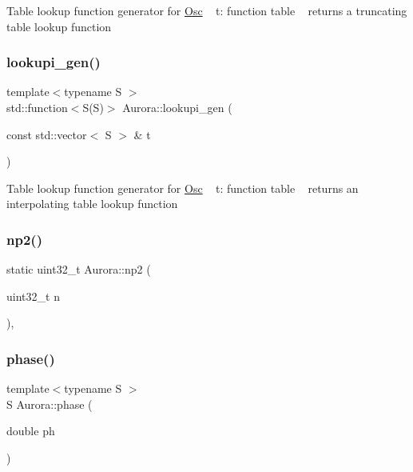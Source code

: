 Table lookup function generator for \hyperlink{class_aurora_1_1_osc}{Osc} ~\newline
t\+: function table ~\newline
returns a truncating table lookup function \mbox{\label{namespace_aurora_a043c55515e053a8d6f31ed7077a1bea6}} 
\subsubsection{\texorpdfstring{lookupi\+\_\+gen()}{lookupi\_gen()}}
{\footnotesize\ttfamily template$<$typename S $>$ \\
std\+::function$<$S(S)$>$ Aurora\+::lookupi\+\_\+gen (\begin{DoxyParamCaption}\item[{const std\+::vector$<$ S $>$ \&}]{t }\end{DoxyParamCaption})}

Table lookup function generator for \hyperlink{class_aurora_1_1_osc}{Osc} ~\newline
t\+: function table ~\newline
returns an interpolating table lookup function \mbox{\label{namespace_aurora_a49b6f6d92479d80271ced42627154066}} 
\subsubsection{\texorpdfstring{np2()}{np2()}}
{\footnotesize\ttfamily static uint32\+\_\+t Aurora\+::np2 (\begin{DoxyParamCaption}\item[{uint32\+\_\+t}]{n }\end{DoxyParamCaption})\hspace{0.3cm}{\ttfamily [inline]}, {\ttfamily [static]}}

\mbox{\label{namespace_aurora_a2fab91108d29c7101741bcd2ebe1ba72}} 
\subsubsection{\texorpdfstring{phase()}{phase()}}
{\footnotesize\ttfamily template$<$typename S $>$ \\
S Aurora\+::phase (\begin{DoxyParamCaption}\item[{double}]{ph }\end{DoxyParamCaption})}

